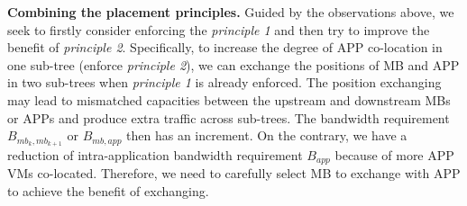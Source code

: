 \documentclass[review]{elsarticle}
\begin{document}
\textbf{Combining the placement principles.} Guided by the observations above, we seek to firstly consider enforcing the \emph{principle 1} and then try to improve the benefit of \emph{principle 2}.
Specifically, to increase the degree of APP co-location in one sub-tree (enforce \emph{principle 2}), we can exchange the positions of MB and APP in two sub-trees when \emph{principle 1} is already enforced. %
The position exchanging may lead to mismatched capacities between the upstream and downstream MBs or APPs and produce extra traffic across sub-trees. The bandwidth requirement $B_{mb_k,mb_{k+1}}$ or $B_{mb,app}$ then has an increment. On the contrary, we have a reduction of intra-application bandwidth requirement $B_{app}$ because of more APP VMs co-located. Therefore, we need to carefully select MB to exchange with APP to achieve the benefit of exchanging.
\end{document}
